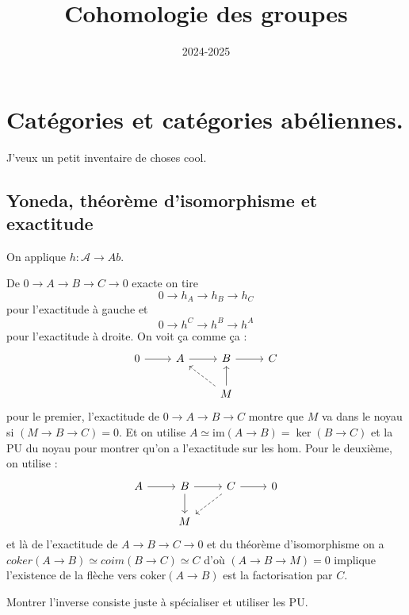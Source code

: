 \documentclass[a4paper,12pt]{book}
\title{Cohomologie des groupes}
\date{2024-2025}
\newcommand{\Aat}{\mathcal{A}}
\newcommand{\im}{\textrm{im}}
\newcommand{\coker}{\textrm{coker}}
\theoremstyle{plain}
\theoremstyle{definition}
\theoremstyle{remark}
\begin{document}
\maketitle
\tableofcontents

\chapter{Catégories et catégories abéliennes.}
J'veux un petit inventaire de choses cool.
\section{Yoneda, théorème d'isomorphisme et exactitude}
On applique $h\colon \Aat\to Ab$.

De $0\to A\to B\to C\to 0$ exacte on tire
\[0\to h_A\to h_B\to h_C\]
pour l'exactitude à gauche et
\[0\to h^C\to h^B\to h^A\]
pour l'exactitude à droite. On voit ça comme ça :
\[\begin{tikzcd}
	0 & A & B & C \\
	&& M
	\arrow[from=1-1, to=1-2]
	\arrow[from=1-2, to=1-3]
	\arrow[from=1-3, to=1-4]
	\arrow[dashed, from=2-3, to=1-2]
	\arrow[from=2-3, to=1-3]
\end{tikzcd}\]
pour le premier, l'exactitude de $0\to A\to B\to C$ montre que
$M$ va dans le noyau si $(M\to B\to C )= 0$. Et on utilise
$A\simeq \im(A\to B)=\ker(B\to C)$ et la PU du
noyau pour montrer qu'on a l'exactitude sur les hom. 
Pour le deuxième, on utilise :
\[\begin{tikzcd}
	A & B & C & 0 \\
	& M
	\arrow[from=1-1, to=1-2]
	\arrow[from=1-2, to=1-3]
	\arrow[from=1-2, to=2-2]
	\arrow[from=1-3, to=1-4]
	\arrow[dashed, from=1-3, to=2-2]
\end{tikzcd}\]
et là de l'exactitude de $A\to B\to C\to 0$ et du théorème 
d'isomorphisme on a $coker(A\to B)\simeq coim(B\to C)\simeq C$
d'où $(A\to B\to M)=0$ implique l'existence de la flèche vers
$\coker(A\to B)$ est la factorisation par $C$.

Montrer l'inverse consiste juste à spécialiser et utiliser les PU.
\end{document}
